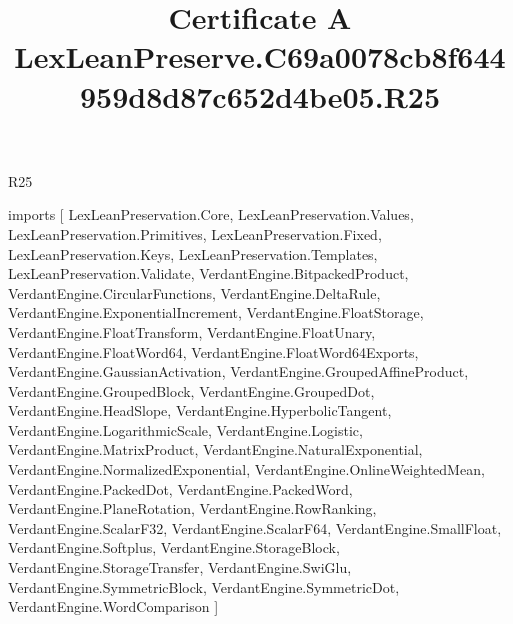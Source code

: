 \begin{lexlean}{R25}
\title{Certificate A LexLeanPreserve.C69a0078cb8f644959d8d87c652d4be05.R25}
\begin{coremodule}
imports [
  LexLeanPreservation.Core,
  LexLeanPreservation.Values,
  LexLeanPreservation.Primitives,
  LexLeanPreservation.Fixed,
  LexLeanPreservation.Keys,
  LexLeanPreservation.Templates,
  LexLeanPreservation.Validate,
  VerdantEngine.BitpackedProduct,
  VerdantEngine.CircularFunctions,
  VerdantEngine.DeltaRule,
  VerdantEngine.ExponentialIncrement,
  VerdantEngine.FloatStorage,
  VerdantEngine.FloatTransform,
  VerdantEngine.FloatUnary,
  VerdantEngine.FloatWord64,
  VerdantEngine.FloatWord64Exports,
  VerdantEngine.GaussianActivation,
  VerdantEngine.GroupedAffineProduct,
  VerdantEngine.GroupedBlock,
  VerdantEngine.GroupedDot,
  VerdantEngine.HeadSlope,
  VerdantEngine.HyperbolicTangent,
  VerdantEngine.LogarithmicScale,
  VerdantEngine.Logistic,
  VerdantEngine.MatrixProduct,
  VerdantEngine.NaturalExponential,
  VerdantEngine.NormalizedExponential,
  VerdantEngine.OnlineWeightedMean,
  VerdantEngine.PackedDot,
  VerdantEngine.PackedWord,
  VerdantEngine.PlaneRotation,
  VerdantEngine.RowRanking,
  VerdantEngine.ScalarF32,
  VerdantEngine.ScalarF64,
  VerdantEngine.SmallFloat,
  VerdantEngine.Softplus,
  VerdantEngine.StorageBlock,
  VerdantEngine.StorageTransfer,
  VerdantEngine.SwiGlu,
  VerdantEngine.SymmetricBlock,
  VerdantEngine.SymmetricDot,
  VerdantEngine.WordComparison
]


\end{coremodule}
\end{lexlean}
